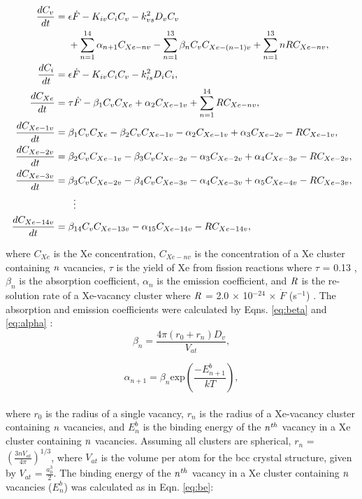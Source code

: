\documentclass[preprint,12pt]{elsarticle}
\begin{document}
\begin{align} 
\label{eqn:Xe_rate1}
\frac{dC_{v}}{dt}={}&\epsilon\dot{F}- K_{iv}C_{i}C_{v} - k_{vs}^{2}D_{v}C_{v} \\
&+\sum_{n=1}^{14} \alpha_{n+1}C_{Xe-nv} -\sum_{n=1}^{13} \beta_{n}C_{v}C_{Xe-(n-1)v} + \sum_{n=1}^{13} nRC_{Xe-nv},\notag\\
\
\label{eqn:Xe_rate2}
\frac{dC_{i}}{dt}={}&\epsilon\dot{F} - K_{iv}C_{i}C_{v} - k_{is}^{2}D_{i}C_{i}, 
\\
\label{eqn:Xe_rate3}
\frac{dC_{Xe}}{dt}={}&\tau\dot{F} - \beta_{1}C_{v}C_{Xe} + \alpha_{2}C_{Xe-1v} + \sum_{n=1}^{14} RC_{Xe-nv},\\
\label{eqn:Xe_rate4}
\frac{dC_{Xe-1v}}{dt}={}&\beta_{1}C_{v}C_{Xe} - \beta_{2}C_{v}C_{Xe-1v} - \alpha_{2}C_{Xe-1v} + \alpha_{3}C_{Xe-2v} - RC_{Xe-1v},
\\
\label{eqn:Xe_rate5}
\frac{dC_{Xe-2v}}{dt}={}& \beta_{2}C_{v}C_{Xe-1v} - \beta_{3}C_{v}C_{Xe-2v} - \alpha_{3}C_{Xe-2v} + \alpha_{4}C_{Xe-3v} - RC_{Xe-2v}, 
\\
\label{eqn:Xe_rate6}
\frac{dC_{Xe-3v}}{dt}={}& \beta_{3}C_{v}C_{Xe-2v} - \beta_{4}C_{v}C_{Xe-3v} - \alpha_{4}C_{Xe-3v} + \alpha_{5}C_{Xe-4v} - RC_{Xe-3v},
\\
&\vdotswithin{=} \notag \\
\label{eqn:Xe_rate7}
\frac{dC_{Xe-14v}}{dt}={}& \beta_{14}C_{v}C_{Xe-13v} - \alpha_{15}C_{Xe-14v} - RC_{Xe-14v},
\end{align}

\noindent where $C_{Xe}$ is the Xe concentration, $C_{Xe-nv}$ is the concentration of a Xe cluster containing $\it{n}$ vacancies, $\tau$ is the yield of Xe from fission reactions where $\tau$ = 0.13 \cite{nichols2008handbook}, $\beta_{n}$ is the absorption coefficient, $\alpha_{n}$ is the emission coefficient, and $\it{R}$ is the re-solution rate of a Xe-vacancy cluster where $\it{R}$ = 2.0 $\times$ 10$^{-24}$ $\times$ $\dot{F}$ (s$^{-1}$) \cite{beeler2021microstructural}. The absorption and emission coefficients were calculated by Eqns. \ref{eq:beta} and \ref{eq:alpha} \cite{bai2017modeling}:\\

\begin{equation}
\label{eq:beta}
\beta_{n} = \frac{4\pi(r_{0}+r_{n})D_{v}}{V_{at}},
\end{equation}

\begin{equation}
\label{eq:alpha}
\alpha_{n+1} = \beta_{n}\textrm{exp}(\frac{-E_{n+1}^{b}}{kT}),
\end{equation}
\\
\noindent where $r_{0}$ is the radius of a single vacancy, $r_{n}$ is the radius of a Xe-vacancy cluster containing $\it{n}$ vacancies, and $E_{n}^{b}$ is the binding energy of the $\it{n}^{th}$ vacancy in a Xe cluster containing $\it{n}$ vacancies. Assuming all clusters are spherical, $r_{n}$ = $(\frac{3nV_{at}}{4\pi})^{1/3}$, where $V_{at}$ is the volume per atom for the bcc crystal structure, given by $V_{at}$ = $\frac{a_{0}^3}{2}$. The binding energy of the $\it{n}^{th}$ vacancy in a Xe cluster containing $\it{n}$ vacancies ($E^{b}_{n}$) was calculated as in Eqn. \ref{eq:be}:\\
\end{document}
